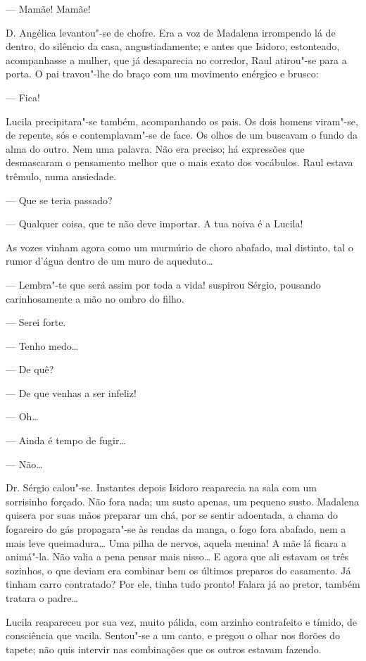 --- Mamãe! Mamãe!

D. Angélica levantou"-se de chofre. Era a voz de Madalena irrompendo lá
de dentro, do silêncio da casa, angustiadamente; e antes que Isidoro,
estonteado, acompanhasse a mulher, que já desaparecia no corredor, Raul
atirou"-se para a porta. O pai travou"-lhe do braço com um movimento
enérgico e brusco:

--- Fica!

Lucila precipitara"-se também, acompanhando os pais. Os dois homens
viram"-se, de repente, sós e contemplavam"-se de face. Os olhos de um
buscavam o fundo da alma do outro. Nem uma palavra. Não era preciso; há
expressões que desmascaram o pensamento melhor que o mais exato dos
vocábulos. Raul estava trêmulo, numa ansiedade.

--- Que se teria passado?

--- Qualquer coisa, que te não deve importar. A tua noiva é a Lucila!

As vozes vinham agora como um murmúrio de choro abafado, mal distinto,
tal o rumor d'água dentro de um muro de aqueduto\ldots{}

--- Lembra"-te que será assim por toda a vida! suspirou Sérgio, pousando
carinhosamente a mão no ombro do filho.

--- Serei forte.

--- Tenho medo\ldots{}

--- De quê?

--- De que venhas a ser infeliz!

--- Oh\ldots{}

--- Ainda é tempo de fugir\ldots{}

--- Não\ldots{}

Dr. Sérgio calou"-se. Instantes depois Isidoro reaparecia na sala com um
sorrisinho forçado. Não fora nada; um susto apenas, um pequeno susto.
Madalena quisera por suas mãos preparar um chá, por se sentir adoentada,
a chama do fogareiro do gás propagara"-se às rendas da manga, o fogo fora
abafado, nem a mais leve queimadura\ldots{} Uma pilha de nervos, aquela
menina! A mãe lá ficara a animá"-la. Não valia a pena pensar mais
nisso\ldots{} E agora que ali estavam os três sozinhos, o que deviam era
combinar bem os últimos preparos do casamento. Já tinham carro
contratado? Por ele, tinha tudo pronto! Falara já ao pretor, também
tratara o padre\ldots{}

Lucila reapareceu por sua vez, muito pálida, com arzinho contrafeito e
tímido, de consciência que vacila. Sentou"-se a um canto, e pregou o
olhar nos florões do tapete; não quis intervir nas combinações que os
outros estavam fazendo.

